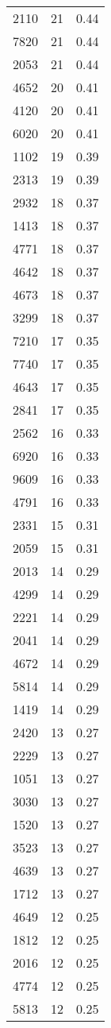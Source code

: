 \begin{table*}[htbp]
\begin{tabular}{lrr}
2110 & 21 & 0.44 \\
7820 & 21 & 0.44 \\
2053 & 21 & 0.44 \\
4652 & 20 & 0.41 \\
4120 & 20 & 0.41 \\
6020 & 20 & 0.41 \\
1102 & 19 & 0.39 \\
2313 & 19 & 0.39 \\
2932 & 18 & 0.37 \\
1413 & 18 & 0.37 \\
4771 & 18 & 0.37 \\
4642 & 18 & 0.37 \\
4673 & 18 & 0.37 \\
3299 & 18 & 0.37 \\
7210 & 17 & 0.35 \\
7740 & 17 & 0.35 \\
4643 & 17 & 0.35 \\
2841 & 17 & 0.35 \\
2562 & 16 & 0.33 \\
6920 & 16 & 0.33 \\
9609 & 16 & 0.33 \\
4791 & 16 & 0.33 \\
2331 & 15 & 0.31 \\
2059 & 15 & 0.31 \\
2013 & 14 & 0.29 \\
4299 & 14 & 0.29 \\
2221 & 14 & 0.29 \\
2041 & 14 & 0.29 \\
4672 & 14 & 0.29 \\
5814 & 14 & 0.29 \\
1419 & 14 & 0.29 \\
2420 & 13 & 0.27 \\
2229 & 13 & 0.27 \\
1051 & 13 & 0.27 \\
3030 & 13 & 0.27 \\
1520 & 13 & 0.27 \\
3523 & 13 & 0.27 \\
4639 & 13 & 0.27 \\
1712 & 13 & 0.27 \\
4649 & 12 & 0.25 \\
1812 & 12 & 0.25 \\
2016 & 12 & 0.25 \\
4774 & 12 & 0.25 \\
5813 & 12 & 0.25 \\

\end{tabular}
\end{table*}
